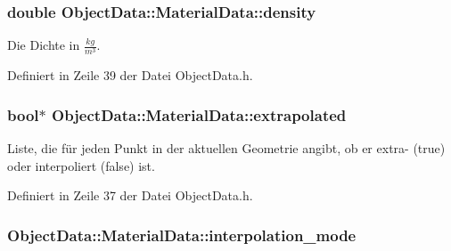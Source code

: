 \hypertarget{structObjectData_1_1MaterialData_a49cbca11f42993f41497e725fe8ca68c}{
\subsubsection[{density}]{\setlength{\rightskip}{0pt plus 5cm}double Object\-Data\-::\-Material\-Data\-::density}}\label{structObjectData_1_1MaterialData_a49cbca11f42993f41497e725fe8ca68c}


Die Dichte in $\frac{kg}{m^3}$. 



Definiert in Zeile 39 der Datei Object\-Data.\-h.

\hypertarget{structObjectData_1_1MaterialData_a22bff8a90f617a5485690bd017dcf701}{
\subsubsection[{extrapolated}]{\setlength{\rightskip}{0pt plus 5cm}bool$\ast$ Object\-Data\-::\-Material\-Data\-::extrapolated}}\label{structObjectData_1_1MaterialData_a22bff8a90f617a5485690bd017dcf701}


Liste, die für jeden Punkt in der aktuellen Geometrie angibt, ob er extra-\/ (true) oder interpoliert (false) ist. 



Definiert in Zeile 37 der Datei Object\-Data.\-h.

\hypertarget{structObjectData_1_1MaterialData_a35d4f03b3af4349f69d5fed072118dca}{
\subsubsection[{interpolation\-\_\-mode}]{ Object\-Data\-::\-Material\-Data\-::interpolation\-\_\-mode}}\label{structObjectData_1_1MaterialData_a35d4f03b3af4349f69d5fed072118dca}


